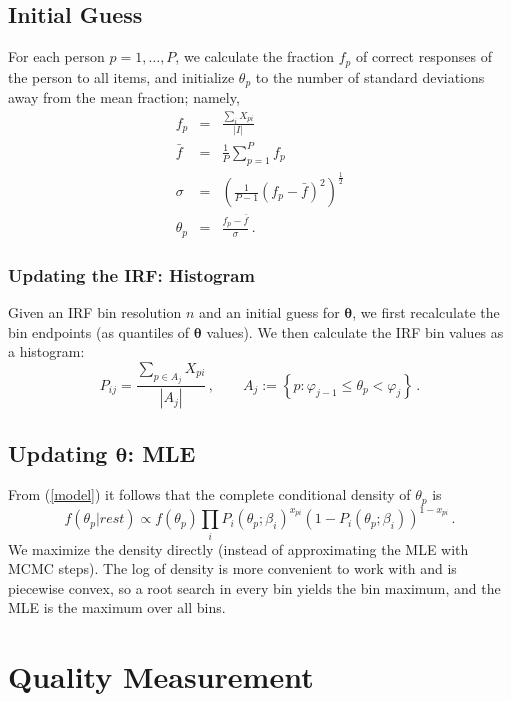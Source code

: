 \documentclass{article}
\newcommand{\bta}{\boldsymbol\ta}
\newcommand{\ta}{\theta}
\begin{document}
\subsection{Initial Guess}
\label{initial_guess}
For each person $p=1,\dots,P$, we calculate the fraction $f_{p}$ of correct responses of the person to all items, and initialize $\ta_{p}$ to the number of standard deviations away from the mean fraction; namely,
\begin{eqnarray}
	f_{p} &=& \frac{\sum_{i} X_{pi}}{|I|} \\
	\bar{f} &=& \frac{1}{P} \sum_{p=1}^{P} f_{p} \\
	\sigma &=& \left(\frac{1}{P-1} (f_{p} - \bar{f})^2 \right)^{\frac12} \\
	\ta_{p} &=& \frac{f_{p} - \bar{f}}{\sigma}\,.
	\label{coarsest_init}
\end{eqnarray}

\subsubsection{Updating the IRF: Histogram}
\label{histogram}
Given an IRF bin resolution $n$ and an initial guess for $\bta$, we first recalculate the bin endpoints (as quantiles of $\bta$ values). We then calculate the IRF bin values as a histogram:
\begin{equation}
	\label{histogram_const}
	P_{ij} = \frac{\sum_{p \in A_j} X_{pi}}{|A_j|}\,,\qquad
	A_j := \left\{ p : \varphi_{j-1} \leq \ta_p < \varphi_j \right\}\,.
\end{equation}

\subsection{Updating $\bta$: MLE}
\label{metropolis}
From (\ref{model}) it follows that the complete conditional density of $\ta_p$ is
\begin{equation}
  f(\ta_p|rest) \propto  f(\ta_p) \prod_i 
 P_i(\ta_p;\beta_i)^{x_{pi}}\left(1 - P_i(\ta_p;\beta_i)\right)^{1-x_{pi}}\,.
  \label{cond_ta}
\end{equation}
We maximize the density directly (instead of approximating the MLE with MCMC steps). The log of density is more convenient to work with and is piecewise convex, so a root search in every bin yields the bin maximum, and the MLE is the maximum over all bins. 
 
\section{Quality Measurement}
\end{document}
